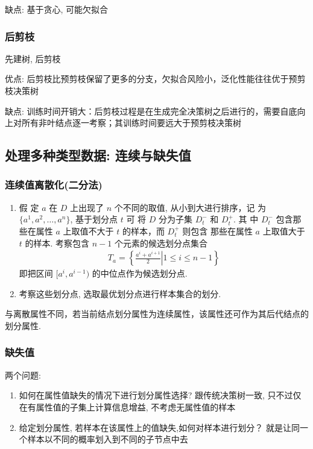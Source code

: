 缺点: 基于贪心, 可能欠拟合

\subsubsection{后剪枝}
先建树, 后剪枝

优点: 后剪枝比预剪枝保留了更多的分支，欠拟合风险小，泛化性能往往优于预剪枝决策树

缺点: 训练时间开销大：后剪枝过程是在生成完全决策树之后进行的，需要自底向上对所有非叶结点逐一考察；其训练时间要远大于预剪枝决策树

\subsection{处理多种类型数据: 连续与缺失值}
\subsubsection{连续值离散化(二分法)}
\begin{enumerate}
    \item 假 定 $a$ 在 $D$ 上出现了 $n$ 个不同的取值, 从小到大进行排序，记 为$\{ a^1,a^2,\dots,a^n \}$, 基于划分点 $t$ 可 将 $D$ 分为子集 $D^-_t$ 和 $D^+_t$. 其 中 $D^-_t$ 包含那些在属性 $a$ 上取值不大于 $t$ 的样本，而 $D^+_t$ 则包含 那些在属性 $a$ 上取值大于 $t$ 的样本. 考察包含 $n - 1$ 个元素的候选划分点集合
    \begin{align*}
        T_a=\left\{ \left.\frac{a^i+a^{i+1}}{2}\right|1\le i\le n-1 \right\}
    \end{align*}
    即把区间 $[a^i, a^{i-1})$ 的中位点作为候选划分点. 
    \item 考察这些划分点, 选取最优划分点进行样本集合的划分. 
\end{enumerate}

与离散属性不同，若当前结点划分属性为连续属性，该属性还可作为其后代结点的划分属性.

\subsubsection{缺失值}
两个问题:
\begin{enumerate}
    \item 如何在属性值缺失的情况下进行划分属性选择? 
    \subitem 跟传统决策树一致, 只不过仅在有属性值的子集上计算信息增益, 不考虑无属性值的样本
    \item 给定划分属性, 若样本在该属性上的值缺失,如何对样本进行划分？
    \subitem 就是让同一个样本以不同的概率划入到不同的子节点中去
\end{enumerate}


